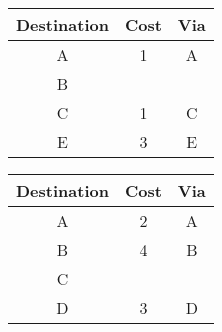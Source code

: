 \documentclass{article}
\newcommand{\8}{$\infty$}
\begin{document}
\begin{tabular}{c|c|c}
Destination & Cost & Via \\ \hline
A           & 1    & A   \\
B           &      &     \\
C           & 1    & C   \\
E           & 3    & E   \\
\end{tabular}
\begin{tabular}{c|c|c}
Destination & Cost & Via \\ \hline
A           & 2    & A   \\
B           & 4    & B   \\
C           &      &     \\
D           & 3    & D   \\
\end{tabular}
\end{document}
